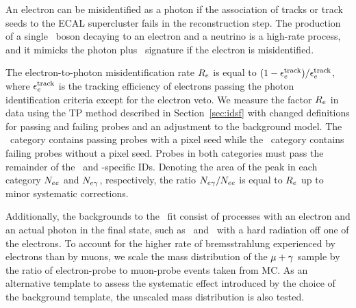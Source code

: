 An electron can be misidentified as a photon if the association of tracks or track seeds to the ECAL supercluster fails in the reconstruction step.
The production of a single \PW\ boson decaying to an electron and a neutrino is a high-rate process, and it mimicks the photon plus \met\ signature if the electron is misidentified.

The electron-to-photon misidentification rate $R_{{e}}$ is equal to $(1 - \epsilon_{{e}}^{\text{track}}) / \epsilon_{{e}}^{\text{track}}$, where $\epsilon_{{e}}^{\text{track}}$ is the tracking efficiency of electrons passing the photon identification criteria except for the electron veto.
We measure the factor $R_{{e}}$ in data using the TP method described in Section~\ref{sec:idsf} with changed definitions for passing and failing probes and an adjustment to the background model.
The \Pe\Pe\ category contains passing probes with a pixel seed while the \Pe\Pgg\ category contains failing probes without a pixel seed.
Probes in both categories must pass the remainder of the \egamma\ and \Pgg-specific IDs.
Denoting the area of the peak in each category $N_{{e}{e}}$ and $N_{{e}\gamma}$, respectively, the ratio $N_{{e}\gamma} / N_{{e}{e}}$ is equal to $R_{{e}}$ up to minor systematic corrections.

Additionally, the backgrounds to the \Pe\Pgg\ fit consist of processes with an electron and an actual photon in the final state, such as \PW\Pgg\ and \Zee\ with a hard radiation off one of the electrons.
To account for the higher rate of bremsstrahlung experienced by electrons than by muons, we scale the mass distribution of the ${\mu}+\gamma$ sample by the ratio of electron-probe to muon-probe events taken from MC.
As an alternative template to assess the systematic effect introduced by the choice of the background template, the unscaled mass distribution is also tested.

